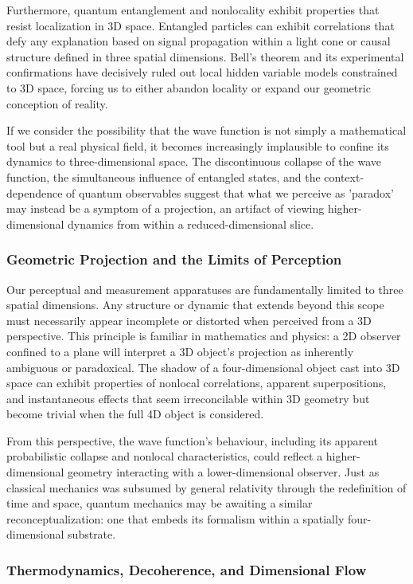 \documentclass[12pt]{article}
\begin{document}
Furthermore, quantum entanglement and nonlocality exhibit properties that resist localization in 3D space. Entangled particles can exhibit correlations that defy any explanation based on signal propagation within a light cone or causal structure defined in three spatial dimensions. Bell’s theorem and its experimental confirmations have decisively ruled out local hidden variable models constrained to 3D space, forcing us to either abandon locality or expand our geometric conception of reality.

If we consider the possibility that the wave function is not simply a mathematical tool but a real physical field, it becomes increasingly implausible to confine its dynamics to three-dimensional space. The discontinuous collapse of the wave function, the simultaneous influence of entangled states, and the context-dependence of quantum observables suggest that what we perceive as 'paradox' may instead be a symptom of a projection, an artifact of viewing higher-dimensional dynamics from within a reduced-dimensional slice.

\subsubsection*{Geometric Projection and the Limits of Perception}

Our perceptual and measurement apparatuses are fundamentally limited to three spatial dimensions. Any structure or dynamic that extends beyond this scope must necessarily appear incomplete or distorted when perceived from a 3D perspective. This principle is familiar in mathematics and physics: a 2D observer confined to a plane will interpret a 3D object’s projection as inherently ambiguous or paradoxical. The shadow of a four-dimensional object cast into 3D space can exhibit properties of nonlocal correlations, apparent superpositions, and instantaneous effects that seem irreconcilable within 3D geometry but become trivial when the full 4D object is considered.

From this perspective, the wave function’s behaviour, including its apparent probabilistic collapse and nonlocal characteristics, could reflect a higher-dimensional geometry interacting with a lower-dimensional observer. Just as classical mechanics was subsumed by general relativity through the redefinition of time and space, quantum mechanics may be awaiting a similar reconceptualization: one that embeds its formalism within a spatially four-dimensional substrate.

\subsubsection*{Thermodynamics, Decoherence, and Dimensional Flow}
\end{document}
